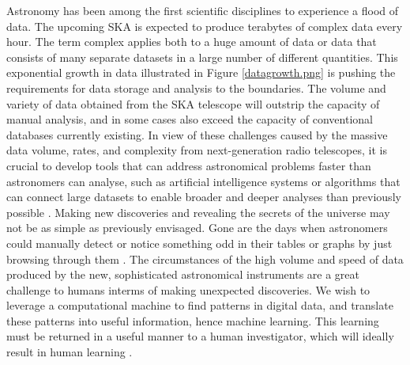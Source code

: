 Astronomy has been among the first scientific disciplines to experience a flood of data. The upcoming SKA is expected to produce terabytes of complex data every hour. The term complex applies both to a huge amount of data or data that consists of many separate datasets in a large number of different quantities. This exponential growth in data illustrated in Figure \ref{datagrowth.png} is pushing the requirements for data storage and analysis to the boundaries. The volume and variety of data obtained from the SKA telescope will outstrip the capacity of manual analysis, and in some cases also exceed the capacity of conventional databases currently existing. In view of these challenges caused by the massive data volume, rates, and complexity from next-generation radio telescopes, it is crucial to develop tools that can address astronomical problems faster than astronomers can analyse, such as artificial intelligence systems or algorithms that can connect large datasets to enable broader and deeper analyses than previously possible \citep{provost2013data}. Making new discoveries and revealing the secrets of the universe may not be as simple as previously envisaged. Gone are the days when astronomers could manually detect or notice something odd in their tables or graphs by just browsing through them \citep{RayNorris}. The circumstances of the high volume and speed of data produced by the new, sophisticated astronomical instruments are a great challenge to humans interms of making unexpected discoveries. We wish to leverage a computational machine to
find patterns in digital data, and translate these patterns into useful information, hence machine learning. This learning must be returned in a useful manner to a human investigator, which will ideally result in human learning \citep{ball2010data}.